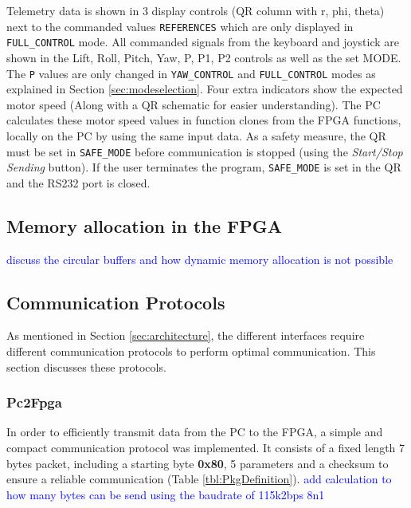 \documentclass{article}
\newcommand\todo[1]{\textcolor{blue}{#1}} %
\begin{document}
Telemetry data is shown in 3 display controls (QR column with r, phi, theta) next to the commanded values \texttt{REFERENCES} which are only displayed in \texttt{FULL\_CONTROL} mode. All commanded signals from the keyboard and joystick are shown in the Lift, Roll, Pitch, Yaw, P, P1, P2 controls as well as the set MODE. The \texttt{P} values are only changed in \texttt{YAW\_CONTROL} and \texttt{FULL\_CONTROL} modes as explained in Section \ref{sec:modeselection}. Four extra indicators show the expected motor speed (Along with a QR schematic for easier understanding). The PC calculates these motor speed values in function clones from the FPGA functions, locally on the PC by using the same input data. As a safety measure, the QR must be set in \texttt{SAFE\_MODE} before communication is stopped (using the \emph{Start/Stop Sending} button). If the user terminates the program, \texttt{SAFE\_MODE} is set in the QR and the RS232 port is closed.


\subsection{Memory allocation in the FPGA}
\todo{discuss the circular buffers and how dynamic memory allocation is not possible}

\subsection{Communication Protocols}
As mentioned in Section \ref{sec:architecture}, the different interfaces require different communication protocols to perform optimal communication. This section discusses these protocols. 


\subsubsection{Pc2Fpga}
In order to efficiently transmit  data from the PC to the FPGA, a simple and compact communication protocol was implemented. It consists of a fixed length 7 bytes packet, including a starting byte \textbf{0x80}, 5 parameters and a checksum to ensure a reliable communication (Table \ref{tbl:PkgDefinition}). \todo{add calculation to how many bytes can be send using the baudrate of 115k2bps 8n1}
\end{document}
